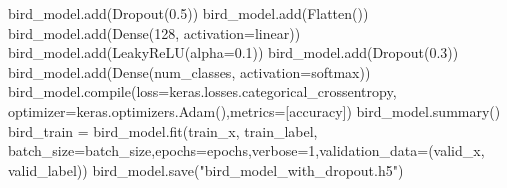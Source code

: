 \documentclass[
  letterpaper,
  DIV=11,
  numbers=noendperiod]{scrartcl}
\newenvironment{Shaded}{\begin{snugshade}}{\end{snugshade}}
\newcommand{\BuiltInTok}[1]{\textcolor[rgb]{0.00,0.23,0.31}{#1}}
\newcommand{\DecValTok}[1]{\textcolor[rgb]{0.68,0.00,0.00}{#1}}
\newcommand{\FloatTok}[1]{\textcolor[rgb]{0.68,0.00,0.00}{#1}}
\newcommand{\NormalTok}[1]{\textcolor[rgb]{0.00,0.23,0.31}{#1}}
\newcommand{\OperatorTok}[1]{\textcolor[rgb]{0.37,0.37,0.37}{#1}}
\newcommand{\StringTok}[1]{\textcolor[rgb]{0.13,0.47,0.30}{#1}}
\begin{document}
\begin{Shaded}
\begin{Highlighting}[]
\NormalTok{bird\_model.add(Dropout(}\FloatTok{0.5}\NormalTok{))}
\NormalTok{bird\_model.add(Flatten())}
\NormalTok{bird\_model.add(Dense(}\DecValTok{128}\NormalTok{, activation}\OperatorTok{=}\StringTok{\textquotesingle{}linear\textquotesingle{}}\NormalTok{))}
\NormalTok{bird\_model.add(LeakyReLU(alpha}\OperatorTok{=}\FloatTok{0.1}\NormalTok{))  }
\NormalTok{bird\_model.add(Dropout(}\FloatTok{0.3}\NormalTok{))}
\NormalTok{bird\_model.add(Dense(num\_classes, activation}\OperatorTok{=}\StringTok{\textquotesingle{}softmax\textquotesingle{}}\NormalTok{))}
\NormalTok{bird\_model.}\BuiltInTok{compile}\NormalTok{(loss}\OperatorTok{=}\NormalTok{keras.losses.categorical\_crossentropy, optimizer}\OperatorTok{=}\NormalTok{keras.optimizers.Adam(),metrics}\OperatorTok{=}\NormalTok{[}\StringTok{\textquotesingle{}accuracy\textquotesingle{}}\NormalTok{])}
\NormalTok{bird\_model.summary()}
\NormalTok{bird\_train }\OperatorTok{=}\NormalTok{ bird\_model.fit(train\_x, train\_label, batch\_size}\OperatorTok{=}\NormalTok{batch\_size,epochs}\OperatorTok{=}\NormalTok{epochs,verbose}\OperatorTok{=}\DecValTok{1}\NormalTok{,validation\_data}\OperatorTok{=}\NormalTok{(valid\_x, valid\_label))}
\NormalTok{bird\_model.save(}\StringTok{"bird\_model\_with\_dropout.h5"}\NormalTok{)}
\end{Highlighting}
\end{Shaded}
\end{document}
